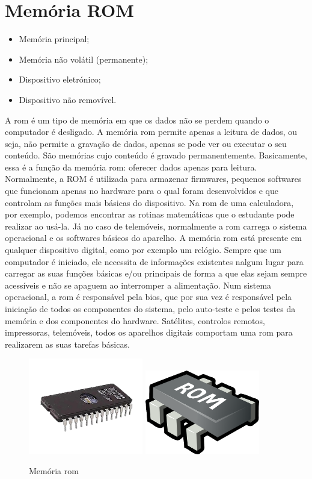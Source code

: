 \documentclass[a4paper]{report}
\begin{document}
\newpage

\section{Memória ROM}
\label{sect.rom}

\begin{itemize}
\item Memória principal;
\item Memória não volátil (permanente);
\item Dispositivo eletrónico;
\item Dispositivo não removível.
\end{itemize}

A \ac{rom} é um tipo de memória em que os dados não se perdem quando o computador é desligado. 
A memória \ac{rom} permite apenas a leitura de dados, ou seja, não permite a gravação de dados, apenas se pode ver ou executar o seu conteúdo. São memórias cujo conteúdo é gravado permanentemente. Basicamente, essa é a função da memória \ac{rom}: oferecer dados apenas para leitura. Normalmente, a ROM é utilizada para armazenar firmwares, pequenos softwares que funcionam apenas no hardware para o qual foram desenvolvidos e que controlam as funções mais básicas do dispositivo.
Na \ac{rom} de uma calculadora, por exemplo, podemos encontrar as rotinas matemáticas que o estudante pode realizar ao usá-la. Já no caso de telemóveis, normalmente a \ac{rom} carrega o sistema operacional e os softwares básicos do aparelho.
 A memória \ac{rom} está presente em qualquer dispositivo digital, como por exemplo um relógio. Sempre que um computador é iniciado, ele necessita de informações existentes nalgum lugar para carregar as suas funções básicas e/ou principais de forma a que elas sejam sempre acessíveis e não se apaguem ao interromper a alimentação. Num sistema operacional, a \ac{rom} é responsável pela \ac{bios}, que por sua vez é responsável pela iniciação de todos os componentes do sistema, pelo auto-teste e pelos testes da memória e dos componentes do hardware.
Satélites, controlos remotos, impressoras, telemóveis, todos os aparelhos digitais comportam uma \ac{rom} para realizarem as suas tarefas básicas.

\begin{figure}[H]
\center
\includegraphics[width=5cm]{Imagens/rom.png}
\includegraphics[width=5cm]{Imagens/rom1.png}
\caption{Memória \ac{rom}}
\end{figure}
\end{document}
